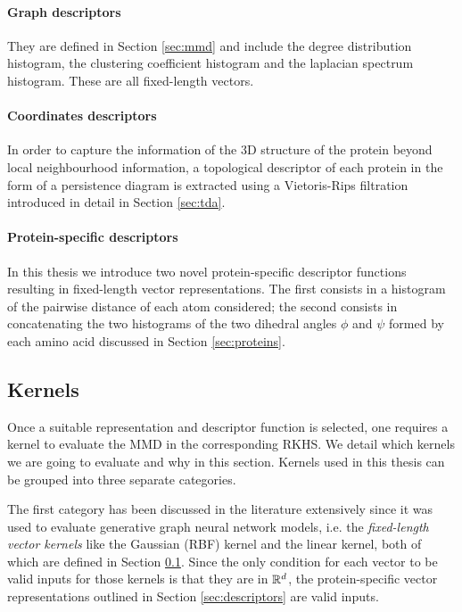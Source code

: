 \paragraph{Graph descriptors} They are defined in Section \ref{sec:mmd} and include
  the degree distribution histogram, the clustering coefficient histogram and
  the laplacian spectrum histogram. These are all fixed-length vectors.
\paragraph{Coordinates descriptors} In order to capture the information of the
3D structure of the protein beyond local neighbourhood information, a
topological descriptor of each protein in the form of a persistence diagram is
extracted using a Vietoris-Rips filtration introduced in detail in Section \ref{sec:tda}.
\paragraph{Protein-specific descriptors} In this thesis we introduce
two novel protein-specific descriptor functions resulting in fixed-length vector
representations. The first consists in a histogram of the pairwise distance of
each atom considered; the second consists in concatenating the two histograms of
the two dihedral angles $\phi$ and $\psi$ formed by each amino acid discussed in Section
\ref{sec:proteins}.


\subsection{Kernels}\label{sec:kernels}
Once a suitable representation and descriptor function is selected, one requires
a kernel to evaluate the MMD in the corresponding RKHS. We detail which kernels
we are going to evaluate and why in this section. Kernels used in this thesis can be grouped into
three separate categories.

The first category has been discussed in the literature extensively since it was
used to evaluate generative graph neural network models, i.e. the
\emph{fixed-length vector kernels} like the Gaussian (RBF) kernel and the linear
kernel, both of which are defined in Section \ref{sec:kernels}. Since the only
condition for each vector to be valid inputs for those kernels is that they are
in $\mathbb{R}^d$, the protein-specific vector representations outlined in Section
\ref{sec:descriptors} are valid inputs.

